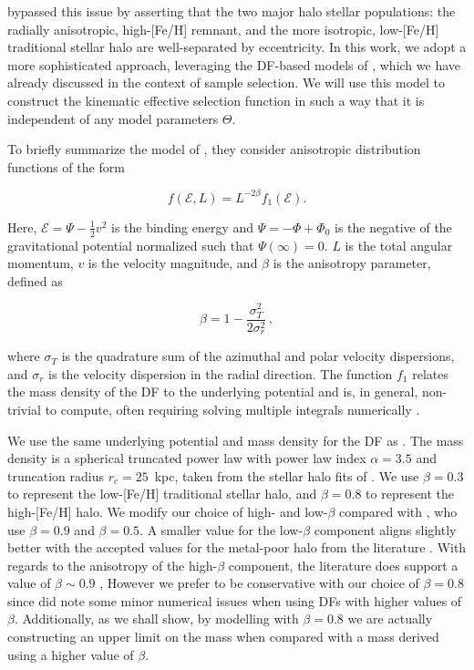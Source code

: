 \cite{mackereth20} bypassed this issue by asserting that the two major halo stellar populations: the radially anisotropic, high-[Fe/H] \gse remnant, and the more isotropic, low-[Fe/H] traditional stellar halo are well-separated by eccentricity. In this work, we adopt a more sophisticated approach, leveraging the DF-based models of \cite{lane22}, which we have already discussed in the context of \gse sample selection. We will use this model to construct the kinematic effective selection function in such a way that it is independent of any model parameters $\Theta$.

To briefly summarize the model of \cite{lane22}, they consider anisotropic distribution functions of the form \parencite[see, e.g.][]{binney08}

\begin{equation}
    \label{eq:anisotropic-df}
    f(\mathcal{E},L) = L^{-2\beta}f_{1}(\mathcal{E}).
\end{equation}

Here, $\mathcal{E} = \Psi - \frac{1}{2}v^{2}$ is the binding energy and $\Psi = -\Phi + \Phi_{0}$ is the negative of the gravitational potential normalized such that $\Psi(\infty) = 0$. $L$ is the total angular momentum, $v$ is the velocity magnitude, and $\beta$ is the anisotropy parameter, defined as

\begin{equation}
    \label{eq:beta}
    \beta = 1- \frac{\sigma_{T}^{2}}{2\sigma^{2}_{r}}\,,
\end{equation}

\noindent where $\sigma_{T}$ is the quadrature sum of the azimuthal and polar velocity dispersions, and $\sigma_{r}$ is the velocity dispersion in the radial direction. The function $f_{1}$ relates the mass density of the DF to the underlying potential and is, in general, non-trivial to compute, often requiring solving multiple integrals numerically \parencite[For more information see ][ particularly Appendix A]{lane22}.

We use the same underlying potential \parencite[\texttt{MWPotential2014 of }][]{bovy15} and mass density for the DF as \cite{lane22}. The mass density is a spherical truncated power law with power law index $\alpha=3.5$ and truncation radius $r_{c} = 25$~kpc, taken from the stellar halo fits of \cite{mackereth20}. We use $\beta=0.3$ to represent the low-[Fe/H] traditional stellar halo, and $\beta=0.8$ to represent the high-[Fe/H] \gse halo. We modify our choice of high- and low-$\beta$ compared with \cite{lane22}, who use $\beta=0.9$ and $\beta=0.5$. A smaller value for the low-$\beta$ component aligns slightly better with the accepted values for the metal-poor halo from the literature \parencite{belokurov18,fattahi19,lancaster19,iorio21}. With regards to the anisotropy of the high-$\beta$ component, the literature does support a value of $\beta \sim 0.9$ \parencite{belokurov18,fattahi19,lancaster19,iorio21}, However we prefer to be conservative with our choice of $\beta=0.8$ since \cite{lane22} did note some minor numerical issues when using DFs with higher values of $\beta$. Additionally, as we shall show, by modelling \gse with $\beta=0.8$ we are actually constructing an upper limit on the mass when compared with a mass derived using a higher value of $\beta$.

